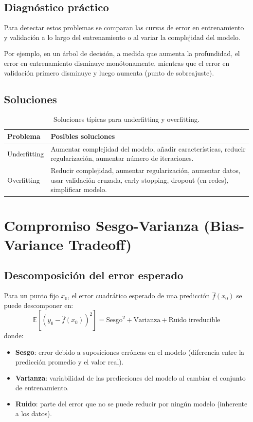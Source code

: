 \documentclass[12pt,a4paper,openany,oneside]{book}
\begin{document}
\subsection{Diagnóstico práctico}
Para detectar estos problemas se comparan las curvas de error en entrenamiento y validación a lo largo del entrenamiento o al variar la complejidad del modelo.

Por ejemplo, en un árbol de decisión, a medida que aumenta la profundidad, el error en entrenamiento disminuye monótonamente, mientras que el error en validación primero disminuye y luego aumenta (punto de sobreajuste).

\subsection{Soluciones}
\begin{table}[h]
\centering
\begin{tabular}{|l|l|}
\hline
\textbf{Problema} & \textbf{Posibles soluciones} \\
\hline
Underfitting & Aumentar complejidad del modelo, añadir características, reducir regularización, aumentar número de iteraciones. \\
Overfitting & Reducir complejidad, aumentar regularización, aumentar datos, usar validación cruzada, early stopping, dropout (en redes), simplificar modelo. \\
\hline
\end{tabular}
\caption{Soluciones típicas para underfitting y overfitting.}
\end{table}

\section{Compromiso Sesgo-Varianza (Bias-Variance Tradeoff)}

\subsection{Descomposición del error esperado}
Para un punto fijo \(x_0\), el error cuadrático esperado de una predicción \(\hat{f}(x_0)\) se puede descomponer en:
\[
\mathbb{E}\left[ (y_0 - \hat{f}(x_0))^2 \right] = \text{Sesgo}^2 + \text{Varianza} + \text{Ruido irreducible}
\]
donde:
\begin{itemize}
    \item \textbf{Sesgo}: error debido a suposiciones erróneas en el modelo (diferencia entre la predicción promedio y el valor real).
    \item \textbf{Varianza}: variabilidad de las predicciones del modelo al cambiar el conjunto de entrenamiento.
    \item \textbf{Ruido}: parte del error que no se puede reducir por ningún modelo (inherente a los datos).
\end{itemize}
\end{document}
